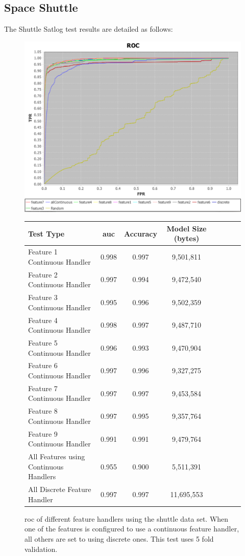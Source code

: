 \documentclass[a4paper,11pt]{scrreprt}
\begin{document}
\subsection{Space Shuttle}
The Shuttle Satlog test results are detailed as follows:
\begin{figure}[h!]
\centering
\caption{\acrshort{roc} of different feature handlers using the shuttle data set. When one of the features is configured to use a continuous feature handler, all others are set to using discrete ones. This test uses 5 fold validation.}
\includegraphics[scale=0.55, trim=0 -25 0 2, clip=true] {features_shuttle.png}
\label{fig:spaceshuttleresults}
\begin{tabular}{l*{6}{c}r}
Test Type & \acrshort{auc} & Accuracy & Model Size (bytes)\\
\hline
Feature 1 Continuous Handler & 0.998 & 0.997 & 9,501,811\\
Feature 2 Continuous Handler & 0.997 & 0.994 & 9,472,540\\
Feature 3 Continuous Handler & 0.995 & 0.996 & 9,502,359\\
Feature 4 Continuous Handler & 0.998 & 0.997 & 9,487,710\\
Feature 5 Continuous Handler & 0.996 & 0.993 & 9,470,904\\
Feature 6 Continuous Handler & 0.997 & 0.996 & 9,327,275\\
Feature 7 Continuous Handler & 0.997 & 0.997 & 9,453,584\\
Feature 8 Continuous Handler & 0.997 & 0.995 & 9,357,764\\
Feature 9 Continuous Handler & 0.991 & 0.991 & 9,479,764\\
All Features using Continuous Handlers & 0.955 & 0.900 & 5,511,391\\
All Discrete Feature Handler & 0.997 & 0.997 & 11,695,553
\end{tabular}
\end{figure}
\end{document}
